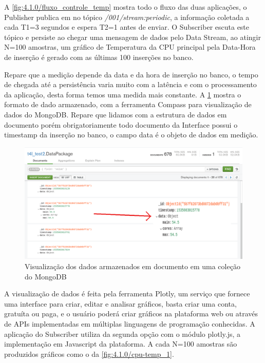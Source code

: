 A \ref{fig:4.1.0/fluxo_controle_temp} mostra todo o fluxo das duas aplicações, o Publisher publica em no tópico \textit{/001/stream:periodic}, a informação coletada a cada T1=3 segundos e espera T2=1 antes de enviar. O Subscriber escuta este tópico e persiste ao chegar uma mensagem de dados pelo Data Stream, ao atingir N=100 amostras, um gráfico de Temperatura da CPU principal pela Data-Hora de inserção é gerado com as últimas 100 inserções no banco.


Repare que a medição depende da data e da hora de inserção no banco, o tempo de chegada até a persistência varia muito com a latência e com o processamento da aplicação, desta forma temos uma medida mais constante. A \ref{fig:4.1.0/comapass} mostra o formato de dado armazenado, com a ferramenta Compass para visualização de dados do MongoDB. Repare que lidamos com a estrutura de dados em documento porém obrigatoriamente todo documento da Interface possui o timestamp da inserção no banco, o campo data é o objeto de dados em medição.

\begin{figure}[h!]
\centering
\includegraphics[width=15cm]{./02_Capitulos/02_Cap4/figures/compass}
\caption{Visualização dos dados armazenados em documento em uma coleção do MongoDB}
\label{fig:4.1.0/comapass}
\end{figure}

A visualização de dados é feita pela ferramenta Plotly, um serviço que fornece uma interface para criar, editar e analisar gráficos, basta criar uma conta, gratuíta ou paga, e o usuário poderá criar gráficos na plataforma web ou através de APIs implementadas em múltiplas linguagens de programação conhecidas. A aplicação do Subscriber utiliza da segunda opção com o módulo plotly.js, a implementação em Javascript da plataforma. A cada N=100 amostras são produzidos gráficos como o da  \ref{fig:4.1.0/cpu-temp_1}.


